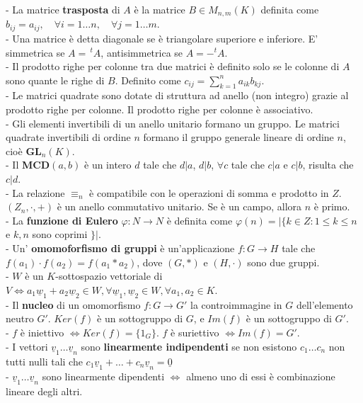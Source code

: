 \documentclass[a4paper,10pt]{article} %
\renewcommand{\b}[1]{%
    {\textbf{#1}}}
\renewcommand{\v}[1]{%
    {\underline{#1}}}
\begin{document}
- La matrice \b{trasposta} di $A$ è la matrice $B \in M_{n,m}(K)$ definita come $b_{ij} = a_{ij}, \quad \forall i = 1 \ldots n, \quad \forall j = 1 \ldots m$.\\
- Una matrice è detta diagonale se è triangolare superiore e inferiore. E' simmetrica se $A = \,^tA$, antisimmetrica se $A = -^tA$.\\
- Il prodotto righe per colonne tra due matrici è definito solo se le colonne di $A$ sono quante le righe di $B$. Definito come $c_{ij} = \sum_{k=1}^n a_{ik}b_{kj}$.\\
- Le matrici quadrate sono dotate di struttura ad anello (non integro) grazie al prodotto righe per colonne. Il prodotto righe per colonne è associativo.\\
- Gli elementi invertibili di un anello unitario formano un gruppo. Le matrici quadrate invertibili di ordine $n$ formano il gruppo generale lineare di ordine $n$, cioè \b{GL}$_n(K)$.\\
- Il \b{MCD$(a,b)$} è un intero $d$ tale che $d|a$, $d|b$, $\forall c$ tale che $c|a$ e $c|b$, risulta che $c|d$.\\
- La relazione $\equiv _n$ è compatibile con le operazioni di somma e prodotto in $Z$. $(Z_n, \cdot, +)$ è un anello commutativo unitario. Se è un campo, allora $n$ è primo.\\
- La \b{funzione di Eulero} $\varphi : N \rightarrow N$ è definita come $\varphi(n) = |\{k \in Z : 1 \leq k \leq n$ e $k , n$ sono coprimi $\}|$.\\
- Un' \b{omomoforfismo di gruppi} è un'applicazione $f : G \rightarrow H$ tale che $f(a_1) \cdot f(a_2) = f(a_1 * a_2)$, dove $(G,*)$ e $(H,\cdot)$ sono due gruppi.\\
- $W$ è un $K$-sottospazio vettoriale di $V \Leftrightarrow a_1\v{w}_1 + a_2\v{w}_2 \in W, \forall \v{w}_1, \v{w}_2 \in W, \forall a_1, a_2 \in K$.\\
- Il \b{nucleo} di un omomorfismo $f : G \rightarrow G'$ la controimmagine in $G$ dell'elemento neutro $G'$. $Ker(f)$ è un sottogruppo di $G$, e $Im(f)$ è un sottogruppo di $G'$.\\
- $f$ è iniettivo $\Leftrightarrow Ker(f) = \{ 1_G \}$. \quad $f$ è suriettivo $\Leftrightarrow Im(f) = G'$.\\ 
- I vettori $\v{v}_1 \ldots \v{v}_n$ sono \b{linearmente indipendenti} se non esistono $c_1 \ldots c_n$ non tutti nulli tali che $c_1\v{v}_1 + \ldots + c_n\v{v}_n = \v{0}$\\
- $\v{v}_1 \ldots \v{v}_n$ sono linearmente dipendenti $\Leftrightarrow$ almeno uno di essi è combinazione lineare degli altri.\\
\end{document}
